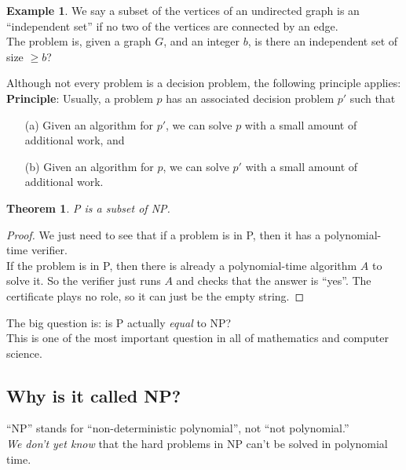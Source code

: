 \documentclass[12pt]{article}
\theoremstyle{plain}
\newtheorem{theorem}{Theorem}[subsection]
\theoremstyle{definition}
\newtheorem*{ex*}{Example}
\begin{document}
\begin{ex*}
We say a subset of the vertices of an undirected graph is an ``independent set'' if no two of the vertices are connected by an edge. \\
The problem is, given a graph $G$, and an integer $b$, is there an independent set of size $\geq b$?
\end{ex*}

Although not every problem is a decision problem, the following principle applies: \\
\textbf{Principle}: Usually, a problem $p$ has an associated decision problem $p'$ such that
\begin{itemize}
  \item[(a)] Given an algorithm for $p'$, we can solve $p$ with a small amount of additional work, and
  \item[(b)] Given an algorithm for $p$, we can solve $p'$ with a small amount of additional work.
\end{itemize}

\begin{theorem}
P is a subset of NP.
\end{theorem}
\begin{proof}
We just need to see that if a problem is in P, then it has a polynomial-time verifier. \\
If the problem is in P, then there is already a polynomial-time algorithm $A$ to solve it.
So the verifier just runs $A$ and checks that the answer is ``yes''.
The certificate plays no role, so it can just be the empty string.
\end{proof}

The big question is: is P actually \emph{equal} to NP? \\
This is one of the most important question in all of mathematics and computer science.

\subsection{Why is it called NP?}
``NP'' stands for ``non-deterministic polynomial'', not ``not polynomial.'' \\
\emph{We don't yet know} that the hard problems in NP can't be solved in polynomial time. \\
\end{document}
